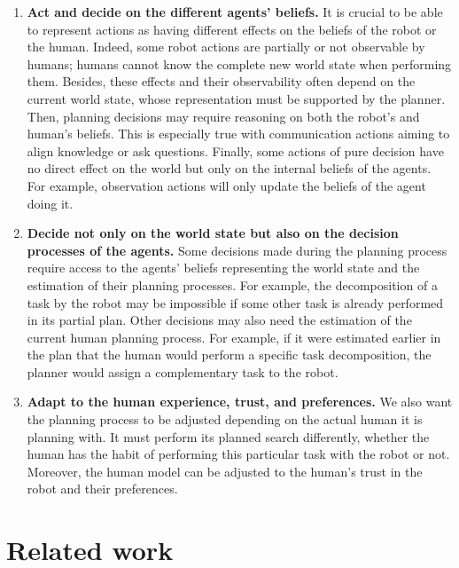 \begin{enumerate}
    \item \textbf{Act and decide on the different agents' beliefs.} It is crucial to be able to represent actions as having different effects on the beliefs of the robot or the human. Indeed, some robot actions are partially or not observable by humans; humans cannot know the complete new world state when performing them. Besides, these effects and their observability often depend on the current world state, whose representation must be supported by the planner. Then, planning decisions may require reasoning on both the robot's and human's beliefs. This is especially true with communication actions aiming to align knowledge or ask questions. Finally, some actions of pure decision have no direct effect on the world but only on the internal beliefs of the agents. For example, observation actions will only update the beliefs of the agent doing it.

    \item \textbf{Decide not only on the world state but also on the decision processes of the agents.} Some decisions made during the planning process require access to the agents' beliefs representing the world state and the estimation of their planning processes. For example, the decomposition of a task by the robot may be impossible if some other task is already performed in its partial plan. Other decisions may also need the estimation of the current human planning process. For example, if it were estimated earlier in the plan that the human would perform a specific task decomposition, the planner would assign a complementary task to the robot.

    \item \textbf{Adapt to the human experience, trust, and preferences.} We also want the planning process to be adjusted depending on the actual human it is planning with. It must perform its planned search differently, whether the human has the habit of performing this particular task with the robot or not. Moreover, the human model can be adjusted to the human's trust in the robot and their preferences.

\end{enumerate}

\section{Related work} \label{sec:ch2_related_work}

